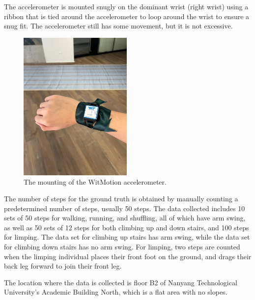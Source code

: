 \documentclass[12pt]{report}
\begin{document}
\clearpage

The accelerometer is mounted snugly on the dominant wrist
(right wrist) using a ribbon that is tied around the accelerometer
to loop around the wrist to ensure a snug fit.
The accelerometer still has some movement, but it is not excessive.

\begin{figure}[htbp]
\centering
\includegraphics[height=20em]{./images/accelerometer-mounting.jpg}
\caption{The mounting of the WitMotion accelerometer.}
\end{figure}

\clearpage

The number of steps for the ground truth is obtained by
manually counting a predetermined number of steps,
usually 50 steps.
The data collected includes 10 sets of 50 steps for walking, running,
and shuffling, all of which have arm swing,
as well as 50 sets of 12 steps for both climbing up and down stairs,
and 100 steps for limping.
The data set for climbing up stairs has arm swing,
while the data set for climbing down stairs has no arm swing.
For limping, two steps are counted when the limping individual
places their front foot on the ground, and drags their back leg
forward to join their front leg.

The location where the data is collected is floor B2
of Nanyang Technological University's Academic Building North,
which is a flat area with no slopes.
\end{document}
